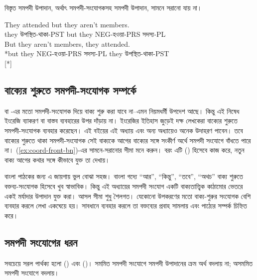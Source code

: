 বিস্তৃত সমপদী উপাদান, অর্থাৎ সমপদী-সংযোগকসহ সমপদী উপাদান, সামনে সরানো যায় না।

\ea \label{ex:coord-front-bn}
    \ea \gll They attended but they aren't members.\\
        they উপস্থিত-থাকা-PST but they NEG-হওয়া-PRS সদস্য-PL\\
    \glt {}
    \ex \gll *But they aren't members, they attended.\\
        *but they NEG-হওয়া-PRS সদস্য-PL they উপস্থিত-থাকা-PST\\
    \glt {} [*]
    \z
\z

\subsection{বাক্যের শুরুতে সমপদী-সংযোগক সম্পর্কে}

 বা -এর মতো সমপদী-সংযোগক দিয়ে বাক্য শুরু করা যাবে না--এমন নিয়মধর্মী উপদেশ আছে। কিন্তু এই নিষেধ ইংরেজি ব্যাকরণ বা বাস্তব ব্যবহারের উপর দাঁড়ায় না। ইংরেজির ইতিহাস জুড়েই দক্ষ লেখকেরা বাক্যের শুরুতে সমপদী-সংযোগক ব্যবহার করেছেন। এই বইয়ের এই অধ্যায় এবং অন্য অধ্যায়েও অনেক উদাহরণ পাবেন। তবে বাক্যের শুরুতে থাকা সমপদী-সংযোগক সেই বাক্যকে আগের বাক্যের সঙ্গে সংকীর্ণ অর্থে সমপদী সংযোগে বাঁধতে পারে না। (\ref{ex:coord-front-bn})-এর সামনে-সরানোর সীমা মনে করুন। বরং এটি  () হিসেবে কাজ করে, নতুন বাক্য আগের কথার সঙ্গে কীভাবে যুক্ত তা দেখায়।

বাংলা পাঠকের জন্য এ জায়গায় ভুল বোঝা সহজ। বাংলা গদ্যে \enquote{আর}, \enquote{কিন্তু}, \enquote{তবে}, \enquote{অথচ} বাক্য শুরুতে বক্তব্য-সংযোগক হিসেবে খুব স্বাভাবিক। কিন্তু এই অধ্যায়ের সমপদী সংযোগ একটি বাক্যতাত্ত্বিক কাঠামোর ভেতরে একই মর্যাদার উপাদান যুক্ত করা। আসল সীমা শুধু শৈলগত। যেকোনো উপকরণের মতো বাক্য-শুরুর সংযোগক বেশি ব্যবহার করলে লেখা একঘেয়ে হয়। সাবধানে ব্যবহার করলে তা বক্তব্যের প্রবাহ সামলায় এবং পাঠ্যের সম্পর্ক চিহ্নিত করে।

\subsection{সমপদী সংযোগের ধরন}

সবচেয়ে সরল পার্থক্য হলো  () এবং  ()। সমমিত সমপদী সংযোগে সমপদী উপাদানের ক্রম অর্থ বদলায় না; অসমমিত সমপদী সংযোগে বদলায়।

